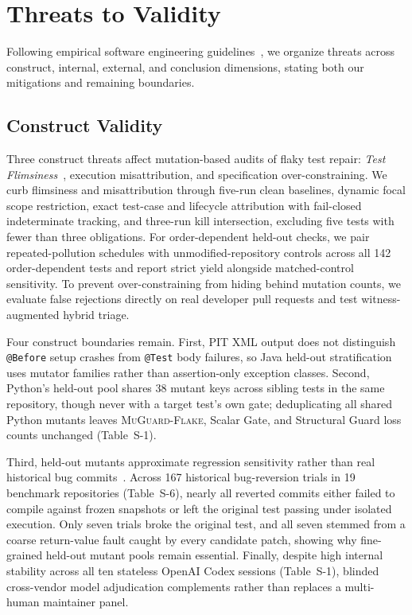 \section{Threats to Validity}
\label{sec:threats}

Following empirical software engineering guidelines~\cite{wohlin2012experimentation,bludau2026szz}, we organize threats across construct, internal, external, and conclusion dimensions, stating both our mitigations and remaining boundaries.

\subsection{Construct Validity}

Three construct threats affect mutation-based audits of flaky test repair: \emph{Test Flimsiness}~\cite{parry2026flimsiness}, execution misattribution, and specification over-constraining. We curb flimsiness and misattribution through five-run clean baselines, dynamic focal scope restriction, exact test-case and lifecycle attribution with fail-closed indeterminate tracking, and three-run kill intersection, excluding five tests with fewer than three obligations. For order-dependent held-out checks, we pair repeated-pollution schedules with unmodified-repository controls across all 142 order-dependent tests and report strict yield alongside matched-control sensitivity. To prevent over-constraining from hiding behind mutation counts, we evaluate false rejections directly on real developer pull requests and test witness-augmented hybrid triage.

Four construct boundaries remain. First, PIT XML output does not distinguish \texttt{@Before} setup crashes from \texttt{@Test} body failures, so Java held-out stratification uses mutator families rather than assertion-only exception classes. Second, Python's held-out pool shares 38 mutant keys across sibling tests in the same repository, though never with a target test's own gate; deduplicating all shared Python mutants leaves \textsc{MuGuard-Flake}, Scalar Gate, and Structural Guard loss counts unchanged (Table~S-1).

Third, held-out mutants approximate regression sensitivity rather than real historical bug commits~\cite{just2014mutants,du2026survivingmutants}. Across 167 historical bug-reversion trials in 19 benchmark repositories (Table~S-6), nearly all reverted commits either failed to compile against frozen snapshots or left the original test passing under isolated execution. Only seven trials broke the original test, and all seven stemmed from a coarse return-value fault caught by every candidate patch, showing why fine-grained held-out mutant pools remain essential. Finally, despite high internal stability across all ten stateless OpenAI Codex sessions (Table~S-1), blinded cross-vendor model adjudication complements rather than replaces a multi-human maintainer panel.

